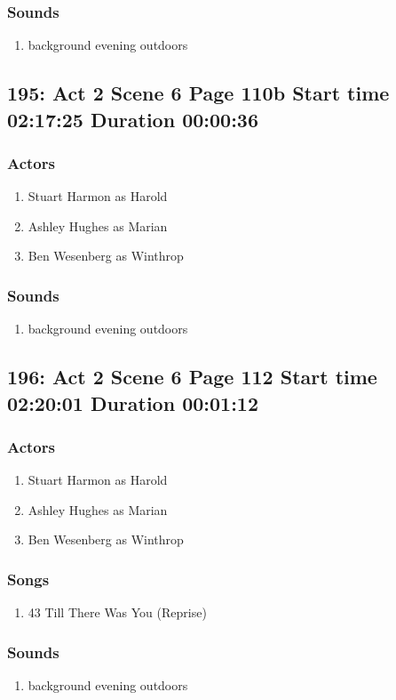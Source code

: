 \subsubsection{Sounds}
\begin{enumerate}
\item background evening outdoors
\end{enumerate}
\subsection{195: Act 2 Scene 6 Page 110b Start time 02:17:25 Duration 00:00:36}

\subsubsection{Actors}
\begin{enumerate}
\item Stuart Harmon as Harold
\item Ashley Hughes as Marian
\item Ben Wesenberg as Winthrop
\end{enumerate}

\subsubsection{Sounds}
\begin{enumerate}
\item background evening outdoors
\end{enumerate}
\subsection{196: Act 2 Scene 6 Page 112 Start time 02:20:01 Duration 00:01:12}

\subsubsection{Actors}
\begin{enumerate}
\item Stuart Harmon as Harold
\item Ashley Hughes as Marian
\item Ben Wesenberg as Winthrop
\end{enumerate}

\subsubsection{Songs}
\begin{enumerate}
\item 43 Till There Was You (Reprise)
\end{enumerate}\subsubsection{Sounds}
\begin{enumerate}
\item background evening outdoors
\end{enumerate}
